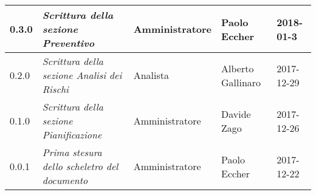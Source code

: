 \begin{table}[H]
\begin{tabular}{C{2cm}|C{4cm}|C{3cm}|C{3cm}|R{2cm}}
		0.3.0 &\emph{Scrittura della sezione Preventivo} & Amministratore & Paolo Eccher & 2018-01-3 \\
		\hline
		
		0.2.0 &\emph{Scrittura della sezione Analisi dei Rischi} & Analista & Alberto Gallinaro & 2017-12-29 \\
		\hline
		
		0.1.0 &\emph{Scrittura della sezione Pianificazione} & Amministratore & Davide Zago & 2017-12-26 \\
		\hline
		
		0.0.1 &\emph{Prima stesura dello scheletro del documento} & Amministratore & Paolo Eccher & 2017-12-22 \\
		
	\end{tabular}
	
\end{table}


\clearpage